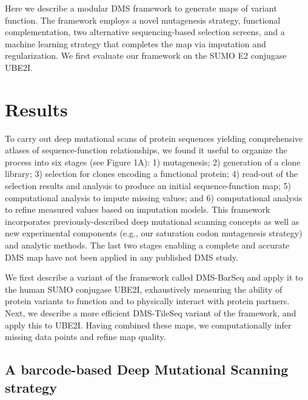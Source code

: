 Here we describe a modular DMS framework to generate maps of variant function. The framework employs a novel mutagenesis strategy, functional complementation, two alternative sequencing-based selection screens, and a machine learning strategy that completes the map via imputation and regularization. We first evaluate our framework on the SUMO E2 conjugase UBE2I.

\section{Results}

To carry out deep mutational scans of protein sequences yielding comprehensive atlases of sequence-function relationships, we found it useful to organize the process into six stages (see Figure 1A): 1) mutagenesis; 2) generation of a clone library; 3) selection for clones encoding a functional protein; 4) read-out of the selection results and analysis to produce an initial sequence-function map; 5) computational analysis to impute missing values; and 6) computational analysis to refine measured values based on imputation models. This framework incorporates previously-described deep mutational scanning concepts as well as new experimental components (e.g., our saturation codon mutagenesis strategy) and analytic methods.  The last two stages enabling a complete and accurate DMS map have not been applied in any published DMS study.

We first describe a variant of the framework called DMS-BarSeq and apply it to the human SUMO conjugase UBE2I, exhaustively measuring the ability of protein variants to function and to physically interact with protein partners.  Next, we describe a more efficient DMS-TileSeq variant of the framework, and apply this to UBE2I.  Having combined these maps, we computationally infer missing data points and refine map quality.

\subsection{A barcode-based Deep Mutational Scanning strategy}

